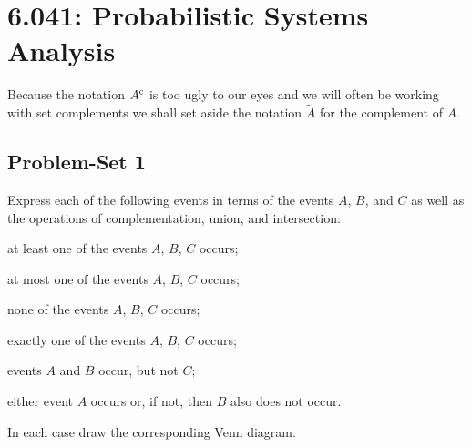 \section{6.041: Probabilistic Systems Analysis}
Because the notation \(A^{\mathrm{c}}\) is too ugly to our eyes and we will often
be working with set complements we shall set aside the notation
\(\tilde A\) for the complement of \(A\).

\subsection{Problem-Set 1}
\begin{problem}
  Express each of the following events in terms of the events \(A\), \(B\),
  and \(C\) as well as the operations of complementation, union, and
  intersection:
  \begin{alphlist}
  \item at least one of the events \(A\), \(B\), \(C\) occurs;
  \item at most one of the events \(A\), \(B\), \(C\) occurs;
  \item none of the events \(A\), \(B\), \(C\) occurs;
  \item exactly one of the events \(A\), \(B\), \(C\) occurs;
  \item events \(A\) and \(B\) occur, but not \(C\);
  \item either event \(A\) occurs or, if not, then \(B\) also does not
    occur.
  \end{alphlist}
  In each case draw the corresponding Venn diagram.
\end{problem}
